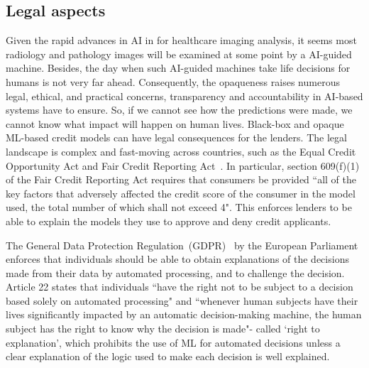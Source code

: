 \subsection{Legal aspects}
Given the rapid advances in AI in for healthcare imaging analysis, it seems most radiology and pathology images will be examined at some point by a AI-guided machine. Besides, the day when such AI-guided machines take life decisions for humans is not very far ahead. Consequently, the opaqueness raises numerous legal, ethical, and practical concerns, transparency and accountability in AI-based systems have to ensure. So, if we cannot see how the predictions were made, we cannot know what impact will happen on human lives. Black-box and opaque ML-based credit models can have legal consequences for the lenders. The legal landscape is complex and fast-moving across countries, such as the Equal Credit Opportunity Act and Fair Credit Reporting Act~\cite{act2009fair}. In particular, section 609(f)(1) of the Fair Credit Reporting Act %
requires that consumers be provided ``all of the key factors that adversely affected the credit score of the consumer in the model used, the total number of which shall not exceed 4". This enforces lenders to be able to explain the models they use to approve and deny credit applicants. 

\hspace*{3.5mm} The General Data Protection Regulation~(GDPR)~\cite{kaminski2019right} by the European Parliament enforces that individuals should be able to obtain explanations of the decisions made from their data by automated processing, and to challenge the decision. Article 22 states that individuals ``have the right not to be subject to a decision based solely on automated processing" and ``whenever human subjects have their lives significantly impacted by an automatic decision-making machine, the human subject has the right to know why the decision is made"- called `right to explanation', which prohibits the use of ML for automated decisions unless a clear explanation of the logic used to make each decision is well explained. 


